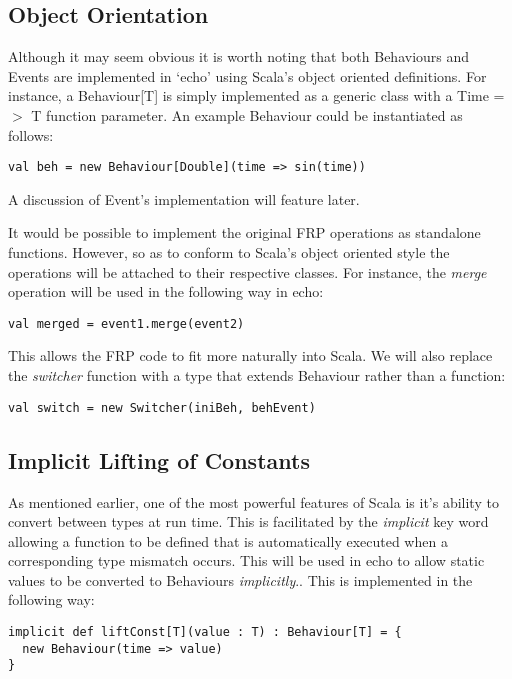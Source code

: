     \subsection{Object Orientation}
      Although it may seem obvious it is worth noting that both Behaviours and Events are implemented in
      `echo' using Scala's object oriented definitions. For instance, a Behaviour[T] is simply
      implemented as a generic class with a Time =$>$ T function parameter. An example Behaviour
      could be instantiated as follows:
 
\begin{verbatim}
val beh = new Behaviour[Double](time => sin(time))
\end{verbatim}  

      A discussion of Event's implementation will feature later.
      
      It would be possible to implement the original FRP operations as standalone functions. However, so
      as to conform to Scala's object oriented style the operations will be attached to their respective
      classes. For instance, the \emph{merge} operation will be used in the following way in echo:
      
\begin{verbatim}
val merged = event1.merge(event2)
\end{verbatim}

    This allows the FRP code to fit more naturally into Scala. We will also replace the \emph{switcher} function
    with a type that extends Behaviour rather than a function:
    
\begin{verbatim}
val switch = new Switcher(iniBeh, behEvent)
\end{verbatim}

    \subsection{Implicit Lifting of Constants}
      As mentioned earlier, one of the most powerful features of Scala is it's ability to convert between
      types at run time. This is facilitated by the \emph{implicit} key word allowing a function to be defined
      that is automatically executed when a corresponding type mismatch occurs. This will be used in echo to allow 
      static values to be converted to Behaviours \emph{implicitly}.. This is implemented in the following way:  

\begin{verbatim}
implicit def liftConst[T](value : T) : Behaviour[T] = {
  new Behaviour(time => value)
}
\end{verbatim}              
      
